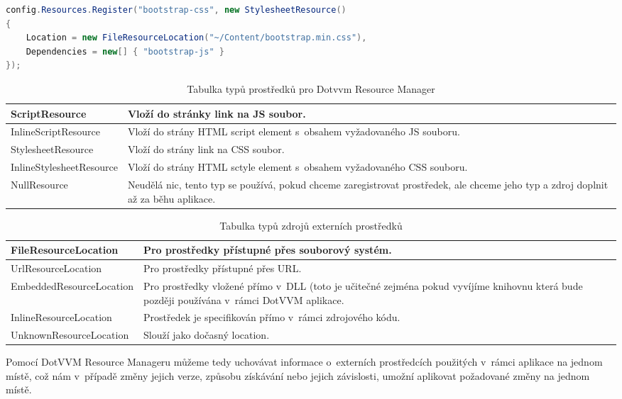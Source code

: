\begin{lstlisting}[language=c#, caption=Registrace CSS,label=resourceAdd,captionpos=t]
config.Resources.Register("bootstrap-css", new StylesheetResource()
{
    Location = new FileResourceLocation("~/Content/bootstrap.min.css"),
    Dependencies = new[] { "bootstrap-js" }
});
\end{lstlisting}

\begin{table}[H]
	\caption{Tabulka typů prostředků pro Dotvvm Resource Manager}
	\label{resTypeTable}
	\centering
	\begin{tabular}{m{12em}|m{22em}}
		\toprule
ScriptResource           & Vloží do stránky link na JS soubor. \\ \midrule
InlineScriptResource     & Vloží do strány HTML script element s~obsahem vyžadovaného JS souboru. \\ \midrule
StylesheetResource       & Vloží do strány link na CSS soubor. \\ \midrule
InlineStylesheetResource & Vloží do strány HTML sctyle element s~obsahem vyžadovaného CSS souboru. \\ \midrule
NullResource             & Neudělá nic, tento typ se používá, pokud chceme zaregistrovat prostředek, ale chceme jeho typ a zdroj doplnit až za běhu aplikace. \\
\bottomrule
\end{tabular}
\end{table}

\begin{table}[H]
	\caption{Tabulka typů zdrojů externích prostředků}
	\label{resLocTable}
	\centering
	\begin{tabular}{m{12em}|m{22em}}
		\toprule
FileResourceLocation           & Pro prostředky přístupné přes souborový systém. \\ \midrule
UrlResourceLocation           & Pro prostředky přístupné přes URL.\\ \midrule
EmbeddedResourceLocation           & Pro prostředky vložené přímo v~DLL (toto je učitečné zejména pokud vyvíjíme knihovnu která bude později používána v~rámci DotVVM aplikace. \\ \midrule
InlineResourceLocation           & Prostředek je specifikován přímo v~rámci zdrojového kódu. \\ \midrule
UnknownResourceLocation           & Slouží jako dočasný location. \\
\bottomrule
\end{tabular}
\end{table}
Pomocí DotVVM Resource Manageru můžeme tedy uchovávat informace o~externích prostředcích použitých v~rámci aplikace na jednom místě, což nám v~případě změny jejich verze, způsobu získávání nebo jejich závislosti, umožní aplikovat požadované změny na jednom místě.


